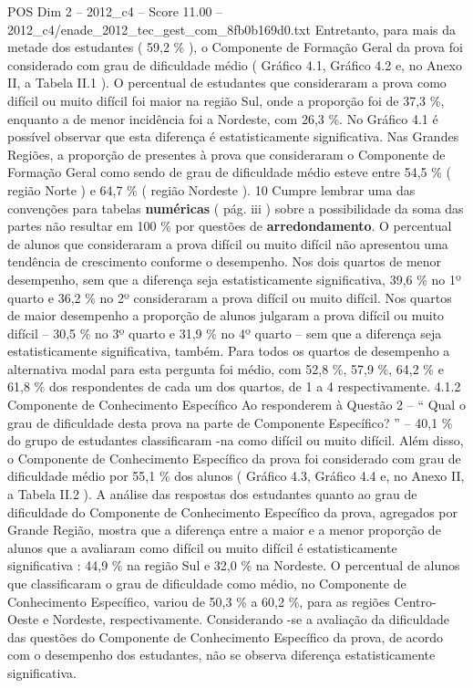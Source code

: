 \begin{textsample}{POS Dim 2 – 2012\_c4 – Score 11.00 – 2012\_c4/enade\_2012\_tec\_gest\_com\_8fb0b169d0.txt}
Entretanto, para mais da metade dos estudantes ( 59,2 \% ), o Componente de Formação Geral da prova foi considerado com grau de dificuldade médio ( Gráfico 4.1, Gráfico 4.2 e, no Anexo II, a Tabela II.1 ).
O percentual de estudantes que consideraram a prova como difícil ou muito difícil foi maior na região Sul, onde a proporção foi de 37,3 \%, enquanto a de menor incidência foi a Nordeste, com 26,3 \%.
No Gráfico 4.1 é possível observar que esta diferença é estatisticamente significativa.
Nas Grandes Regiões, a proporção de presentes à prova que consideraram o Componente de Formação Geral como sendo de grau de dificuldade médio esteve entre 54,5 \% ( região Norte ) e 64,7 \% ( região Nordeste ). 10 Cumpre lembrar uma das convenções para tabelas \textbf{numéricas} ( pág. iii ) sobre a possibilidade da soma das partes não resultar em 100 \% por questões de \textbf{arredondamento}.
O percentual de alunos que consideraram a prova difícil ou muito difícil não apresentou uma tendência de crescimento conforme o desempenho.
Nos dois quartos de menor desempenho, sem que a diferença seja estatisticamente significativa, 39,6 \% no 1º quarto e 36,2 \% no 2º consideraram a prova difícil ou muito difícil.
Nos quartos de maior desempenho a proporção de alunos julgaram a prova difícil ou muito difícil – 30,5 \% no 3º quarto e 31,9 \% no 4º quarto – sem que a diferença seja estatisticamente significativa, também.
Para todos os quartos de desempenho a alternativa modal para esta pergunta foi médio, com 52,8 \%, 57,9 \%, 64,2 \% e 61,8 \% dos respondentes de cada um dos quartos, de 1 a 4 respectivamente. 4.1.2 Componente de Conhecimento Específico Ao responderem à Questão 2 – “ Qual o grau de dificuldade desta prova na parte de Componente Específico? ” – 40,1 \% do grupo de estudantes classificaram -na como difícil ou muito difícil.
Além disso, o Componente de Conhecimento Específico da prova foi considerado com grau de dificuldade médio por 55,1 \% dos alunos ( Gráfico 4.3, Gráfico 4.4 e, no Anexo II, a Tabela II.2 ).
A análise das respostas dos estudantes quanto ao grau de dificuldade do Componente de Conhecimento Específico da prova, agregados por Grande Região, mostra que a diferença entre a maior e a menor proporção de alunos que a avaliaram como difícil ou muito difícil é estatisticamente significativa : 44,9 \% na região Sul e 32,0 \% na Nordeste.
O percentual de alunos que classificaram o grau de dificuldade como médio, no Componente de Conhecimento Específico, variou de 50,3 \% a 60,2 \%, para as regiões Centro-Oeste e Nordeste, respectivamente.
Considerando -se a avaliação da dificuldade das questões do Componente de Conhecimento Específico da prova, de acordo com o desempenho dos estudantes, não se observa diferença estatisticamente significativa.

\end{textsample}
